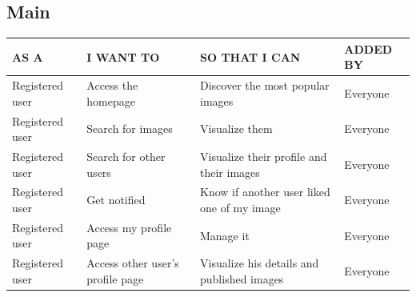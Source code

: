 \documentclass[11pt, a4paper]{article}
\begin{document}
\subsection{Main}
\begin{table}[H]
    \centering
    \begin{tabular}{|p{4.5cm}|p{4cm}|p{5cm}|p{3cm}|}
    \hline
    \rowcolor[HTML]{EFEFEF} 
    AS A            & I WANT TO                        & SO THAT I CAN                              & ADDED BY \\ \hline
    Registered user & Access the homepage              & Discover the most popular images           & Everyone \\ \hline
    Registered user & Search for images                & Visualize them                             & Everyone \\ \hline
    Registered user & Search for other users           & Visualize their profile and their images   & Everyone \\ \hline
    Registered user & Get notified                     & Know if another user liked one of my image & Everyone \\ \hline
    Registered user & Access my profile page           & Manage it                                  & Everyone \\ \hline
    Registered user & Access other user's profile page & Visualize his details and published images & Everyone \\ \hline
    \end{tabular}
\end{table}
\begin{figure}[H]
    \centering
\end{figure}
\end{document}
